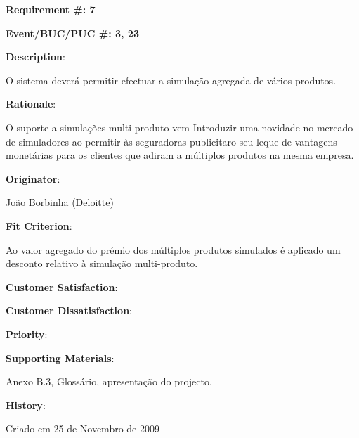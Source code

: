 \pagebreak

\begin{minipage}{0.55\textwidth}
\begin{flushleft}\textbf{Requirement \#: 7}\end{flushleft}
\end{minipage}
\begin{minipage}{0.4\textwidth}
\begin{flushright}\textbf{Event/BUC/PUC \#: 3, 23}\end{flushright}
\end{minipage}

\begin{description}
\item \textbf{Description}:

O sistema deverá permitir efectuar a simulação agregada de vários produtos.\\

\item \textbf{Rationale}:

O suporte a simulações multi-produto vem Introduzir uma novidade no mercado de simuladores ao permitir às seguradoras publicitaro seu leque de vantagens monetárias para os clientes que adiram a múltiplos produtos na mesma empresa.\\

\item \textbf{Originator}:

João Borbinha (Deloitte)\\

\item \textbf{Fit Criterion}:

Ao valor agregado do prémio dos múltiplos produtos simulados é aplicado um desconto relativo à simulação multi-produto.\\

\begin{minipage}{0.45\textwidth}
\begin{flushleft}\item \textbf{Customer Satisfaction}:\end{flushleft}
\end{minipage}
\begin{minipage}{0.45\textwidth}
\begin{flushleft}\item \textbf{Customer Dissatisfaction}:\end{flushleft}
\end{minipage}

\item \textbf{Priority}:\\

\item \textbf{Supporting Materials}:

Anexo B.3, Glossário, apresentação do projecto.\\

\item \textbf{History}:

Criado em 25 de Novembro de 2009\\
\end{description}

